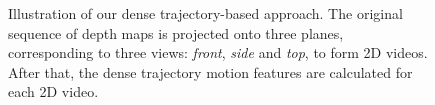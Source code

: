 \documentclass[final,3p,times,twocolumn]{elsarticle}
\begin{document}
\begin{figure}[t]
	\centering
	\caption{Illustration of our dense trajectory-based approach. The original sequence of depth maps is projected onto three planes, corresponding to three views: \textit{front}, \textit{side} and \textit{top}, to form 2D videos. After that, the dense trajectory motion features are calculated for each 2D video.}
		\label{Figure_ProposedMethod}
\end{figure}
\end{document}
